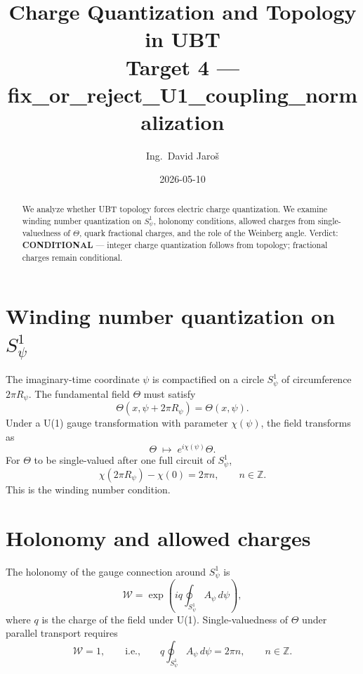 \documentclass[11pt,a4paper]{article}
\title{Charge Quantization and Topology in UBT\\
\large Target 4 — fix\_or\_reject\_U1\_coupling\_normalization}
\author{Ing.\ David Jaroš}
\date{2026-05-10}
\begin{document}
\maketitle

\begin{abstract}
We analyze whether UBT topology forces electric charge quantization.  We examine
winding number quantization on $S^1_\psi$, holonomy conditions, allowed charges
from single-valuedness of $\Theta$, quark fractional charges, and the role of
the Weinberg angle.  Verdict: \textbf{CONDITIONAL} — integer charge
quantization follows from topology; fractional charges remain conditional.
\end{abstract}

\section{Winding number quantization on $S^1_\psi$}

The imaginary-time coordinate $\psi$ is compactified on a circle
$S^1_\psi$ of circumference $2\pi R_\psi$.  The fundamental field $\Theta$
must satisfy
\begin{equation}
  \Theta(x,\psi+2\pi R_\psi)=\Theta(x,\psi).
\end{equation}
Under a U(1) gauge transformation with parameter $\chi(\psi)$, the field
transforms as
\begin{equation}
  \Theta\;\longmapsto\; e^{i\chi(\psi)}\Theta.
\end{equation}
For $\Theta$ to be single-valued after one full circuit of $S^1_\psi$,
\begin{equation}
  \chi(2\pi R_\psi)-\chi(0) = 2\pi n,\qquad n\in\mathbb{Z}.
\end{equation}
This is the winding number condition.

\section{Holonomy and allowed charges}

The holonomy of the gauge connection around $S^1_\psi$ is
\begin{equation}
  \mathcal{W}=\exp\!\left(iq\oint_{S^1_\psi}A_\psi\,d\psi\right),
\end{equation}
where $q$ is the charge of the field under U(1).  Single-valuedness of $\Theta$
under parallel transport requires
\begin{equation}
  \mathcal{W} = 1,\qquad\text{i.e.,}\qquad
  q\oint_{S^1_\psi}A_\psi\,d\psi = 2\pi n,\qquad n\in\mathbb{Z}.
\end{equation}
\end{document}
